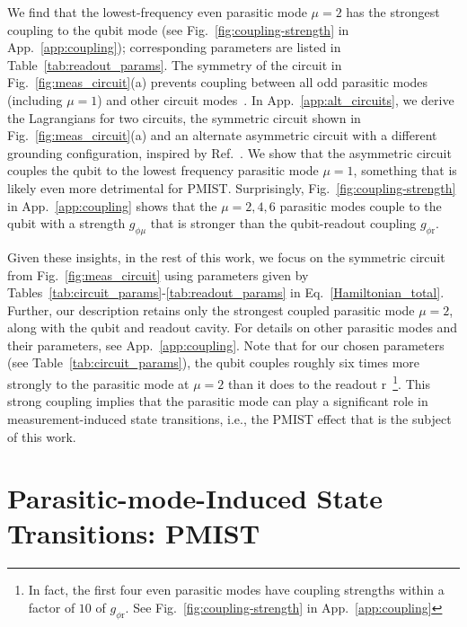 \documentclass[%
reprint,
superscriptaddress,
 amsmath,amssymb,
 aps,
 prx,
longbibliography,
floatfix,
]{revtex4-2}
\begin{document}
We find that the lowest-frequency even parasitic mode $\mu=2$ has the strongest coupling to the qubit mode (see Fig.~\ref{fig:coupling-strength} in App.~\ref{app:coupling}); corresponding parameters are listed in Table~\ref{tab:readout_params}. The symmetry of the circuit in Fig.~\ref{fig:meas_circuit}(a) prevents coupling between all odd parasitic modes (including $\mu=1$) and other circuit modes~\cite{viola2015collective}. In App.~\ref{app:alt_circuits}, we derive the Lagrangians for two circuits, the symmetric circuit shown in Fig.~\ref{fig:meas_circuit}(a) and an alternate asymmetric circuit with a different grounding configuration, inspired by Ref.~\cite{zhang_universal_2021}. We show that the asymmetric circuit couples the qubit to the lowest frequency parasitic mode $\mu=1$, something that is likely even more detrimental for PMIST. Surprisingly, Fig.~\ref{fig:coupling-strength} in App.~\ref{app:coupling} shows that the $\mu=2,4,6$ parasitic modes couple to the qubit with a strength $g_{\phi\mu}$ that is stronger than the qubit-readout coupling $g_{\phi \textrm{r}}$.

Given these insights, in the rest of this work, we focus on the symmetric circuit from Fig.~\ref{fig:meas_circuit} using parameters given by Tables~\ref{tab:circuit_params}-\ref{tab:readout_params} in Eq.~\ref{Hamiltonian_total}. Further, our description retains only the strongest coupled parasitic mode $\mu = 2$, along with the qubit and readout cavity. For details on other parasitic modes and their parameters, see App.~\ref{app:coupling}. Note that for our chosen parameters (see Table~\ref{tab:circuit_params}), the qubit couples roughly six times more strongly to the parasitic mode at $\mu=2$ than it does to the readout $\mathrm{r}$~\footnote{In fact, the first four even parasitic modes have coupling strengths within a factor of $10$ of $g_{\phi \textrm{r}}$. See Fig.~\ref{fig:coupling-strength} in App.~\ref{app:coupling}}. This strong coupling implies that the parasitic mode can play a significant role in measurement-induced state transitions, i.e., the PMIST effect that is the subject of this work.

\section{Parasitic-mode-Induced State Transitions: PMIST}\label{sec:MIST}
\end{document}
